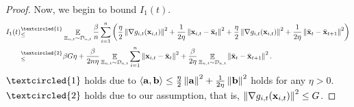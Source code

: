 \documentclass{article}
\begin{document}
\begin{proof}
Now, we begin to bound $I_1(t)$.
\begin{align}
\nonumber
I_1(t) \refabovecir{\le}{\textcircled{1}} & \EE_{ \Xi_{n,t} \sim \Dcal_{n,t} }\frac{\beta}{n}\sum_{i=1}^n \lrincir{ \frac{\eta}{2}\lrnorm{\nabla g_{i,t}(\x_{i,t})}^2 + \frac{1}{2\eta}\lrnorm{\x_{i,t} - \bar{\x}_t}^2  + \frac{\eta}{2}\lrnorm{\nabla g_{i,t}(\x_{i,t})}^2 + \frac{1}{2\eta}\lrnorm{\bar{\x}_t - \bar{\x}_{t+1}}^2 }\\ \nonumber
\refabovecir{\le}{\textcircled{2}} & \beta G \eta + \frac{\beta}{2n\eta } \EE_{ \Xi_{n,t} \sim \Dcal_{n,t} } \sum_{i=1}^n \lrnorm{\x_{i,t} - \bar{\x}_t}^2 + \frac{\beta }{2\eta }\EE_{ \Xi_{n,t} \sim \Dcal_{n,t} } \lrnorm{\bar{\x}_t - \bar{\x}_{t+1}}^2.
\end{align} $\textcircled{1}$ holds due to $\left\langle{\bf a},{\bf b} \right\rangle \le \frac{\eta}{2}\left\lVert{\bf a}\right\rVert^2 + \frac{1}{2\eta}\left\lVert{\bf b}\right\rVert^2$ holds for any $\eta>0$. $\textcircled{2}$ holds due to our assumption, that is, $\left\lVert\nabla g_{i,t}({\bf x}_{i,t})\right\rVert^2 \le G$.


\end{proof}
\end{document}

